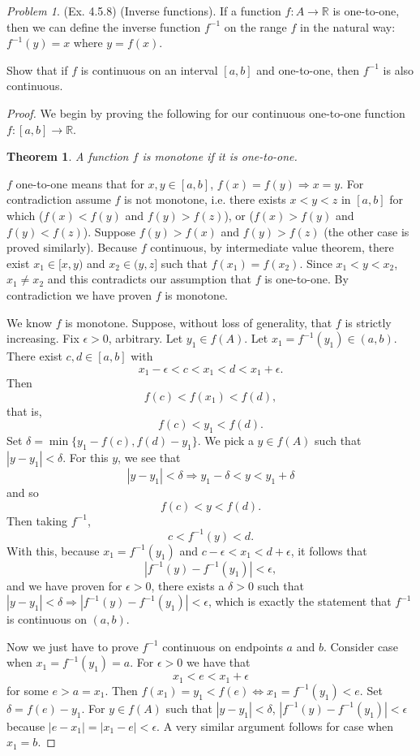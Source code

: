 \documentclass[11pt,twoside, reqno]{amsart}
\newtheorem{Thm}{Theorem}
\theoremstyle{remark}
\newtheorem{Prob}{Problem}
\def\R{\mathbb R}
\renewcommand{\implies}{\Rightarrow}
\renewcommand{\iff}{\Leftrightarrow}
\begin{document}
\begin{Prob}(Ex. 4.5.8) (Inverse functions). If a function $f : A \to \R$ is one-to-one, then we can define the inverse function $f^{-1}$ on the range $f$ in the natural way: $f^{-1}(y) = x$ where $y = f(x)$.

Show that if $f$ is continuous on an interval $[a,b]$ and one-to-one, then $f^{-1}$ is also continuous.
\end{Prob}

\begin{proof} 
We begin by proving the following  for our continuous one-to-one function $f:[a,b] \to \R$. 
\begin{Thm}
A function $f$ is monotone if it is one-to-one.
\end{Thm}
$f$ one-to-one means that for $x,y \in [a,b]$, $f(x) = f(y) \implies x = y$. For contradiction assume $f$ is not monotone, i.e. there exists $x < y < z$ in $[a,b]$ for which ($f(x) < f(y)$ and $f(y) > f(z)$), or ($f(x) > f(y)$ and $f(y) < f(z)$). Suppose $f(y) > f(x)$ and $f(y) > f(z)$ (the other case is proved similarly). Because $f$ continuous, by intermediate value theorem, there exist $x_1 \in [x, y)$ and $x_2 \in (y, z]$ such that $f(x_1) = f(x_2)$. Since $x_1 < y < x_2$, $x_1 \neq x_2$ and this contradicts our assumption that $f$ is one-to-one. By contradiction we have proven $f$ is monotone.

We know $f$ is monotone. Suppose, without loss of generality, that $f$ is strictly increasing. Fix $\epsilon > 0$, arbitrary. Let $y_1 \in f(A)$. Let $x_1 = f^{-1}(y_1) \in (a,b)$. There exist $c, d \in [a,b]$ with 
$$
x_1 - \epsilon < c < x_1 < d < x_1 + \epsilon.
$$
Then
$$
    f(c) < f(x_1) < f(d),
$$
that is,
$$
    f(c) < y_1 < f(d).
$$
Set $\delta = \min \{y_1 - f(c), f(d) - y_1\}$. We pick a $y \in f(A)$ such that $|y - y_1| < \delta$. For this $y$, we see that
$$
    |y - y_1| < \delta \implies y_1 - \delta < y < y_1 + \delta
$$
and so
$$
    f(c) < y < f(d).
$$
Then taking $f^{-1}$,
$$
    c < f^{-1}(y) < d.
$$
With this, because $x_1 = f^{-1}(y_1)$ and $c - \epsilon < x_1 < d + \epsilon$, it follows that
$$
    |f^{-1}(y) - f^{-1}(y_1)| < \epsilon,
$$
and we have proven for $\epsilon > 0$, there exists a $\delta > 0$ such that $|y - y_1| < \delta \implies |f^{-1}(y) - f^{-1}(y_1)| < \epsilon$, which is exactly the statement that $f^{-1}$ is continuous on $(a,b)$.

Now we just have to prove $f^{-1}$ continuous on endpoints $a$ and $b$. Consider case when $x_1 = f^{-1}(y_1) = a$. For $\epsilon > 0$ we have that
$$
    x_1 < e < x_1 + \epsilon
$$
for some $e > a = x_1$. Then $f(x_1) = y_1 < f(e) \iff x_1 = f^{-1}(y_1) < e$. Set $\delta = f(e) - y_1$. For $y \in f(A)$ such that $|y - y_1| < \delta$, $|f^{-1}(y) - f^{-1}(y_1)| < \epsilon$ because $|e - x_1| = |x_1 - e| < \epsilon$. A very similar argument follows for case when $x_1 = b$.

\end{proof}
\end{document}
